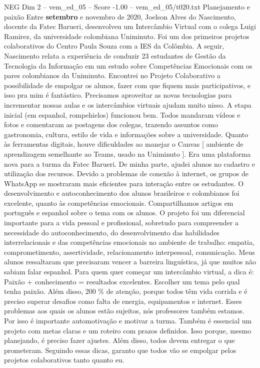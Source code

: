 \begin{textsample}{NEG Dim 2 – vem\_ed\_05 – Score -1.00 – vem\_ed\_05/t020.txt}  \label{ex:f2_neg_023}
Planejamento e paixão Entre \textbf{setembro} e novembro de 2020, Joelson Alves do Nascimento, docente da Fatec Barueri, desenvolveu um Intercâmbio Virtual com o colega Luigi Ramirez, da universidade colombiana Uniminuto.
Foi um dos primeiros projetos colaborativos do Centro Paula Souza com a IES da Colômbia.
A seguir, Nascimento relata a experiência de conduzir 23 estudantes de Gestão da Tecnologia da Informação em um estudo sobre Competências Emocionais com os pares colombianos da Uniminuto.
Encontrei no Projeto Colaborativo a possibilidade de empolgar os alunos, fazer com que fiquem mais participativos, e isso pra mim é fantástico.
Precisamos aproveitar as novas tecnologias para incrementar nossas aulas e os intercâmbios virtuais ajudam muito nisso.
A etapa inicial (em espanhol, rompehielos) funcionou bem.
Todos mandaram vídeos e fotos e comentaram as postagens dos colegas, trazendo assuntos como gastronomia, cultura, estilo de vida e informações sobre a universidade.
Quanto às ferramentas digitais, houve dificuldades ao manejar o Canvas [ ambiente de aprendizagem semelhante ao Teams, usado na Uniminuto ].
Era uma plataforma nova para a turma da Fatec Barueri.
De minha parte, ajudei alunos no cadastro e utilização dos recursos.
Devido a problemas de conexão à internet, os grupos de WhatsApp se mostraram mais eficientes para interação entre os estudantes.
O desenvolvimento e autoconhecimento dos alunos brasileiros e colombianos foi excelente, quanto às competências emocionais.
Compartilhamos artigos em português e espanhol sobre o tema com os alunos.
O projeto foi um diferencial importante para a vida pessoal e profissional, sobretudo para compreender a necessidade do autoconhecimento, do desenvolvimento das habilidades interrelacionais e das competências emocionais no ambiente de trabalho: empatia, comprometimento, assertividade, relacionamento interpessoal, comunicação.
Meus alunos ressaltaram que precisaram vencer a barreira linguística, já que muitos não sabiam falar espanhol.
Para quem quer começar um intercâmbio virtual, a dica é: Paixão + conhecimento = resultados excelentes.
Escolher um tema pelo qual tenha paixão.
Além disso, 200 \% de atenção, porque todos têm vida corrida e é preciso superar desafios como falta de energia, equipamentos e internet.
Esses problemas aos quais os alunos estão sujeitos, nós professores também estamos.
Por isso é importante automotivação e motivar a turma.
Também é essencial um projeto com metas claras e um roteiro com prazos definidos.
Isso porque, mesmo planejando, é preciso fazer ajustes.
Além disso, todos devem entregar o que prometeram.
Seguindo essas dicas, garanto que todos vão se empolgar pelos projetos colaborativos tanto quanto eu.

\end{textsample}
